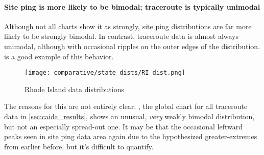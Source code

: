 \paragraph{Site ping is more likely to be bimodal; traceroute is typically unimodal}

Although not all \kde charts show it as strongly, site ping distributions are far more likely to be strongly bimodal. In contrast, traceroute data is almost always unimodal, although with occasional ripples on the outer edges of the distribution.  is a good example of this behavior.

\begin{wrapfigure}[14]{L}{0.55\textwidth}
    \centering
    \texttt{[image: comparative/state\_dists/RI\_dist.png]}
    \caption{Rhode Island data distributions}
    \label{fig:comparative_ri_dist}
\end{wrapfigure}

The reasons for this are not entirely clear. , the global \kde chart for all traceroute data in \cref{sec:caida_results}, shows an unusual, \textit{very} weakly bimodal distribution, but not an especially spread-out one. It may be that the occasional leftward peaks seen in site ping data area again due to the hypothesized greater-extremes from earlier before, but it's difficult to quantify.
